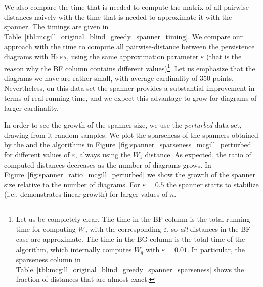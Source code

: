 \documentclass[]{ws-ijcga}
\newcommand{\eps}{\varepsilon}
\newcommand{\dtype}[1]{{\textit{\small #1}}}
\newcommand{\libraryname}[1]{{\textsc{#1}}\xspace}
\newcommand{\hera}{\libraryname{Hera}}
\newcommand{\wsdist}[1]{{W_{#1}}}
\begin{document}
We also compare the time that is needed to compute the matrix of all pairwise distances
naively with the time that is needed to approximate it with the \bgrdy spanner.
The timings are given in Table~\ref{tbl:mcgill_original_blind_greedy_spanner_timing}.
We compare our approach with the time to compute all pairwise-distance between the
persistence diagrams with \hera, using the same approximation parameter
$\eps$ (that is the reason why the BF column contains different values)\footnote{Let us be completely clear. The time in the BF column is the total running time for computing 
$\wsdist{q}$ with the corresponding $\eps$, so \textit{all} distances in the BF case are approximate. The time in the BG column
is the total time of the \bgrdy algorithm, which internally computes $\wsdist{q}$ with $\eps = 0.01$. In particular,
the sparseness column in Table~\ref{tbl:mcgill_original_blind_greedy_spanner_sparseness} shows the fraction of distances that are almost exact.}.
Let us emphasize that the diagrams we have are rather small,
with average cardinality of
350 points. Nevertheless, on this data set the \bgrdy spanner
provides a substantial improvement in terms of real running time,
and we expect this advantage to grow for diagrams of larger cardinality.



In order to see the growth of the spanner size, we use the \dtype{perturbed}
data set, drawing from it random samples.
We plot the sparseness of the spanners obtained by the \grdy
and the \bgrdy algorithms in Figure~\ref{fig:spanner_sparseness_mcgill_perturbed}
for different values of $\eps$, always using the $\wsdist{1}$ distance.
As expected, the ratio of computed distances decreases as the number of diagrams
grows. In Figure~\ref{fig:spanner_ratio_mcgill_perturbed} we show
the growth of the spanner size relative to the number of diagrams.
For $\eps = 0.5$ the \bgrdy spanner starts to stabilize (i.e., demonstrates
linear growth) for larger values of $n$.
\end{document}

